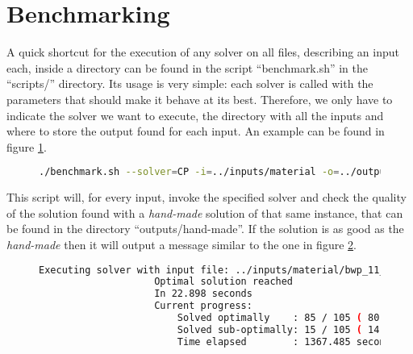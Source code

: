 \section{Benchmarking}
\label{sec:benchmarking}

A quick shortcut for the execution of any solver on all files, describing
an input each, inside a directory can be found in the script ``benchmark.sh''
in the ``scripts/'' directory. Its usage is very simple: each solver is
called with the parameters that should make it behave at its best. Therefore,
we only have to indicate the solver we want to execute, the directory with
all the inputs and where to store the output found for each input. An example
can be found in figure \ref{fig:benchmark-example}.

\begin{figure}[H]
\centering
\begin{lstlisting}[language=bash,basicstyle=\centering]
./benchmark.sh --solver=CP -i=../inputs/material -o=../outputs/CP
\end{lstlisting}
\label{fig:benchmark-example}
\end{figure}

This script will, for every input, invoke the specified solver and check the
quality of the solution found with a \textit{hand-made} solution of that same
instance, that can be found in the directory ``outputs/hand-made''. If the
solution is as good as the \textit{hand-made} then it will output a message
similar to the one in figure \ref{fig:benchmark-verbose:optimal}.

\begin{figure}[H]
\centering
\begin{lstlisting}[language=bash]
				Executing solver with input file: ../inputs/material/bwp_11_10_1.in
					Optimal solution reached
					In 22.898 seconds
					Current progress:
						Solved optimally    : 85 / 105 ( 80.95% )
						Solved sub-optimally: 15 / 105 ( 14.28% )
						Time elapsed        : 1367.485 seconds
\end{lstlisting}
\label{fig:benchmark-verbose:optimal}
\end{figure}

